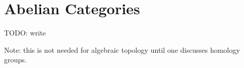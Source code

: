 \chapter{Abelian Categories}
TODO: write

Note: this is not needed for algebraic topology until one discusses homology groups.
